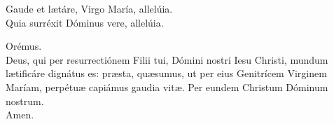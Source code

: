 \begin{multicols}{2}

\setlength{\parskip}{0.5em}
\V Gaude et lætáre, Virgo María, allelúia.\\
\R Quia surréxit Dóminus vere, allelúia.

Orémus.\\
Deus, qui per resurrectiónem Filii tui, Dómini nostri Iesu Christi,
mundum lætificáre dignátus es:
præsta, quæsumus, ut per eius Genitrícem Virginem Maríam,
perpétuæ capiámus gaudia vitæ.
Per eundem Christum Dóminum nostrum.\\
\R Amen.
\setlength{\parskip}{0.5em}

\end{multicols}

